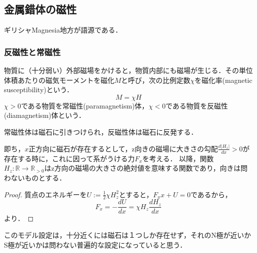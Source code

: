 \documentclass[uplatex, dvipdfmx]{jsreport}
\begin{document}
\subsection{金属錯体の磁性}
ギリシャMagnesia地方が語源である．

\subsubsection{反磁性と常磁性}

\begin{definition}
    物質に（十分弱い）外部磁場をかけると，物質内部にも磁場が生じる．その単位体積あたりの磁気モーメントを磁化$M$と呼び，次の比例定数$\chi$を磁化率(magnetic susceptibility)という．
    \[ M=\chi H \]
    $\chi>0$である物質を常磁性(paramagnetism)体，$\chi<0$である物質を反磁性(diamagnetism)体という．
\end{definition}

\begin{proposition}
    常磁性体は磁石に引きつけられ，反磁性体は磁石に反発する．

    即ち，$x$正方向に磁石が存在するとして，z向きの磁場に大きさの勾配$\frac{d|H_z|}{dx}>0$が存在する時に，これに因って系がうける力$F_x$を考える．
    以降，関数$H_z:\mathbb{R}\to\mathbb{R}_{>0}$はz方向の磁場の大きさの絶対値を意味する関数であり，向きは問わないものとする．
\end{proposition}
\begin{proof}
    質点のエネルギーを$U:=\frac{1}{2}\chi H_z^2$とすると，$F_xx+U=0$であるから，
    \[ F_x=-\frac{dU}{dx}=\chi H_z\frac{dH_z}{dx} \]
    より．
\end{proof}
\begin{remark}
    このモデル設定は，十分近くには磁石は１つしか存在せず，それのN極が近いかS極が近いかは問わない普遍的な設定になっていると思う．
\end{remark}
\end{document}
